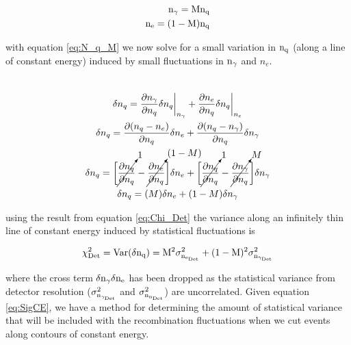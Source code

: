 \begin{equation}
\begin{split}
\rm n_\gamma = M n_q \\
\rm n_e = (1-M) n_q \\
\label{eq:N_q_M}
\end{split}
\end{equation}

\noindent with equation \ref{eq:N_q_M} we now solve for a small variation in $\rm n_q$ (along a line of constant energy) induced by small fluctuations in $\rm n_\gamma$ and $n_e$.

\begin{multline}\\
\delta n_q = \frac{\partial n_\gamma}{\partial n_q} \delta n_q \bigg|_{n_{\gamma}} + \frac{\partial n_e}{\partial n_q} \delta n_q \bigg|_{n_{e}} \\
\delta n_q = \frac{\partial (n_q-n_e)}{\partial n_q} \delta n_e + \frac{\partial (n_q-n_\gamma)}{\partial n_q} \delta n_\gamma \\
\delta n_q = \bigg[\cancelto{\tiny{1}}{\frac{\partial n_q}{\partial n_q}}-\cancelto{\tiny{(1-M)}}{\frac{\partial n_e}{\partial n_q}}\bigg] \delta n_e + \bigg[\cancelto{\tiny{1}}{\frac{\partial n_q}{\partial n_q}}-\cancelto{\tiny{M}}{\frac{\partial n_\gamma}{\partial n_q}}\bigg] \delta n_\gamma  \\
\delta n_q = (M) \delta n_e + (1-M) \delta n_\gamma \\
\label{eq:Chi_Det}
\end{multline}

\noindent using the result from equation \ref{eq:Chi_Det} the variance along an infinitely thin line of constant energy induced by statistical fluctuations is

\begin{equation}
\rm \chi_{Det}^2= Var(\delta n_q) = M^2\sigma_{n_{e_{Det}}}^2 + (1-M)^2\sigma_{n_{\gamma_{Det}}}^2
\label{eq:SigCE}
\end{equation}

\noindent where the cross term $\rm \delta n_\gamma \delta n_e$ has been dropped as the statistical variance from detector resolution ($\rm \sigma_{n_{\gamma_{Det}}}^2$ and $\rm \sigma_{n_{n_{Det}}}^2$) are uncorrelated. Given equation \ref{eq:SigCE}, we have a method for determining the amount of statistical variance that will be included with the recombination fluctuations when we cut events along contours of constant energy. %
 
